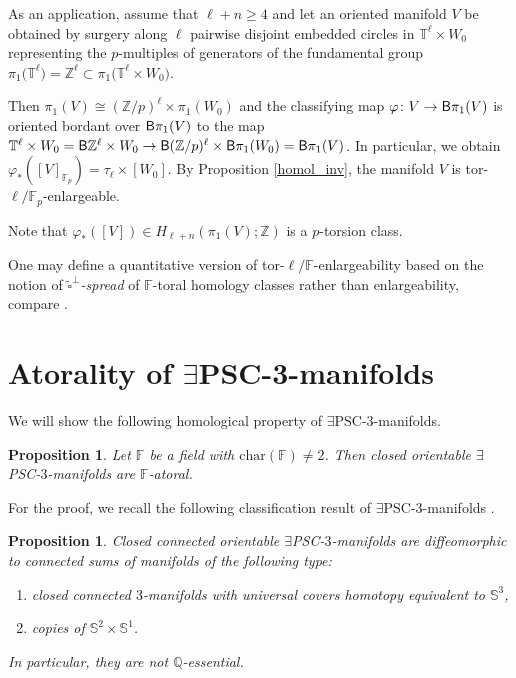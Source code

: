 \documentclass[pdftex]{sigma}
\numberwithin{equation}{section}
\newtheorem{Proposition}[Theorem]{Proposition}
\newcommand{\F}{\mathbb{F}}
\newcommand{\Z}{\mathbb{Z}}
\newcommand{\SSS}{\mathbb{S}}
\newcommand{\TTT}{\mathbb{T}}
\newcommand{\charac}{\mathrm{char}}
\newcommand{\sB}{{\sf B}}
\newcommand{\myicon}{$\,\,\,\triangleright$}
\newcommand{\yes}{{\color {blue!70!black}$\exists$}{\sf PSC}}
\begin{document}
\begin{Example}
As an application, assume that $\ell + n \geq 4$ and let an oriented manifold $V$ be obtained by surgery along $\ell$ pairwise disjoint embedded circles in $\TTT^{\ell} \times W_0$ representing the $p$-multiples of generators of the fundamental group $\pi_1\big({\TTT}^\ell\big) = \Z^\ell \subset \pi_1\big(\TTT^{\ell} \times W_0\big)$.


Then $\pi_1(V) \cong (\Z/p)^\ell \times \pi_1(W_0)$ and the classifying map $\varphi \colon V \to \sB \pi_1(V)$ is oriented bordant over $\sB \pi_1(V)$ to the map $\TTT^{\ell} \times W_0 = \sB \Z^{\ell} \times W_0 \to \sB (\Z/p)^{\ell} \times \sB \pi_1(W_0) = \sB \pi_1(V)$.
In particular, we obtain $\varphi_{*}([V]_{\F_p}) = \tau_\ell \times [W_0]$.
By Proposition \ref{homol_inv}, the manifold $V$ is tor-$\ell/\F_p$-enlargeable.

Note that $\varphi_*([V]) \in H_{\ell+n}(\pi_1(V); \Z)$ is a $p$-torsion class.
\end{Example}

\begin{Remark} One may define a quantitative version of tor-$\ell/\F$-enlargeability based on the notion of {\em $\tilde \square^{\perp}$-spread} of $\F$-toral homology classes rather than enlargeability, compare \cite[Section~7.1]{Gr21}.
\end{Remark}


\section[Atorality of PSC-3-manifolds]{Atorality of \yes-$\boldsymbol{3}$-manifolds} \label{nopsc}

We will show the following homological property of \yes-$3$-manifolds.

 \begin{Proposition} \label{prop:toralthree}
Let $\F$ be a field with $\charac( \F) \neq 2$.
Then closed orientable \yes-$3$-manifolds are $\F$-atoral.
\end{Proposition}

For the proof, we recall the following classification result of \yes-$3$-manifolds \cite{G-L1983}.

\begin{Proposition} \label{prop:decompthree} Closed connected orientable \yes-$3$-manifolds are diffeomorphic to connected sums of manifolds of the following type:
\begin{enumerate}[\myicon]\itemsep=0pt
\item closed connected $3$-manifolds with universal covers homotopy equivalent to $\SSS^3$,
\item copies of $\SSS^2\times \SSS^1$.
\end{enumerate}
In particular, they are not $\mathbb{Q}$-essential.
\end{Proposition}
\end{document}
